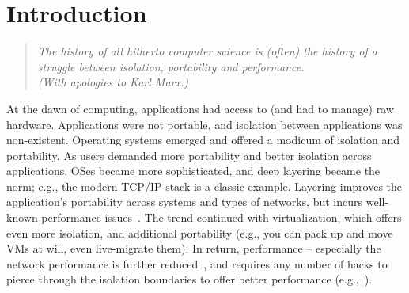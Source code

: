 \section{Introduction} 
\label{sec:introduction}

\begin{quote}
{\em 
The history of all hitherto computer science is (often) the history of a
struggle between isolation, portability and performance. \\ 
(With apologies to Karl Marx.)}
\end{quote}

At the dawn of computing, applications had access to (and had to manage) raw
hardware. Applications were not portable, and isolation between
applications was non-existent. Operating systems emerged and offered a modicum 
of isolation and portability.  As users demanded more portability and better
isolation across applications, OSes became more sophisticated,
and deep layering became the norm; e.g., the modern TCP/IP stack is a classic
example.  Layering improves the application's portability across
systems and types of  networks, but incurs well-known performance
issues~\cite{dcqcn,netmap}. The trend continued with virtualization, which offers even more isolation, and
additional portability (e.g., you can pack up and move VMs at will, even live-migrate
them). In return, performance -- especially the network performance is further
reduced~\cite{}, and requires any number of hacks to pierce through the
isolation boundaries to offer better performance (e.g.,~\cite{sriov,netvm,netmap,dpdk}).





